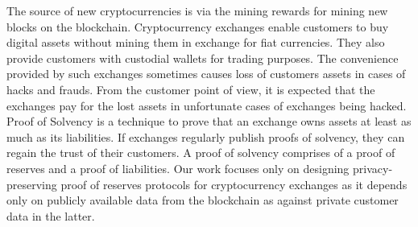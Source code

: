 \begin{Abstract}

The source of new cryptocurrencies is via the mining rewards for mining new blocks on the blockchain.
Cryptocurrency exchanges enable customers to buy digital assets without mining them in exchange for fiat currencies.
They also provide customers with custodial wallets for trading purposes. 
The convenience provided by such exchanges sometimes causes loss of customers assets in cases of hacks and frauds.
From the customer point of view, it is expected that the exchanges pay for the lost assets in unfortunate cases of exchanges being hacked.
Proof of Solvency is a technique to prove that an exchange owns assets at least as much as its liabilities.
If exchanges regularly publish proofs of solvency, they can regain the trust of their customers.
A proof of solvency comprises of a proof of reserves and a proof of liabilities.
Our work focuses only on designing privacy-preserving proof of reserves protocols for cryptocurrency exchanges as it depends only on publicly available data from the blockchain as against private customer data in the latter.


\end{Abstract}
